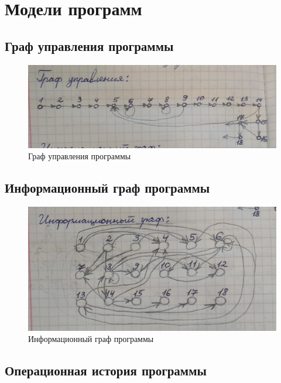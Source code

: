 \documentclass[12pt]{report}
\begin{document}
	\chapter{Модели программ}
	
	\section{Граф управления программы}
	
	\begin{figure}[h]
		\centering
		\includegraphics[scale=0.2]{control_graph.jpg}
		\caption{Граф управления программы}
		\label{fig:mpr}
	\end{figure}

	\newpage
	
	\section{Информационный граф программы}
	
	\begin{figure}[h]
		\centering
		\includegraphics[scale=0.21]{inform_graph.jpg}
		\caption{Информационный граф программы}
		\label{fig:mpr}
	\end{figure}

	\newpage
	
	\section{Операционная история программы}
	
\end{document}
